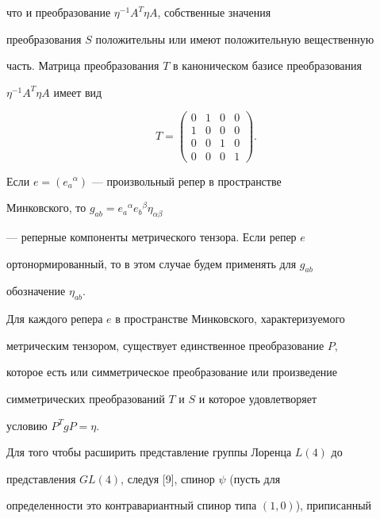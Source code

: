 что и преобразование ${\eta^{-1}A^{T}\eta A}$, собственные значения


преобразования $S$ положительны или имеют положительную вещественную


часть. Матрица преобразования $T$ в каноническом базисе преобразования


${\eta^{-1}A^{T}\eta }A$ имеет вид


$$


T=


\begin{pmatrix}


0 & 1 & 0 & 0 \\


1 & 0 & 0 & 0 \\


0 & 0 & 1 & 0 \\


0 & 0 & 0 & 1


\end{pmatrix}


.


$$


Если $e=(e_a{}^\alpha)$ --- произвольный репер в пространстве


Минковского, то $g_{ab}=e_a{}^\alpha e_b{}^\beta\eta_{\alpha\beta}$


--- реперные компоненты метрического тензора. Если репер $e$


ортонормированный, то в этом случае будем применять для $g_{ab}$


обозначение $\eta_{ab}$.





Для каждого репера $e$ в пространстве Минковского, характеризуемого


метрическим тензором, существует единственное преобразование $P$,


которое есть или симметрическое преобразование или произведение


симметрических преобразований $T$ и $S$ и которое удовлетворяет


условию $P^T gP=\eta$.





Для того чтобы расширить представление группы Лоренца $L(4)$ до


представления $GL(4)$, следуя [9], спинор $\psi$ (пусть для


определенности это контравариантный спинор типа $(1,0)$), приписанный


